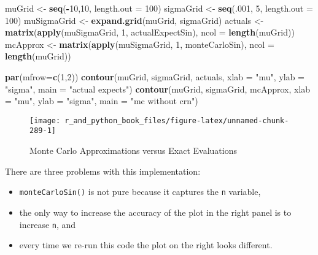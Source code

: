 \documentclass[12pt,krantz2]{krantz}
\makeatletter
\newenvironment{Shaded}{\begin{snugshade}}{\end{snugshade}}
\newcommand{\DataTypeTok}[1]{\textcolor[rgb]{0.27,0.27,0.27}{#1}}
\newcommand{\DecValTok}[1]{\textcolor[rgb]{0.06,0.06,0.06}{#1}}
\newcommand{\KeywordTok}[1]{\textcolor[rgb]{0.27,0.27,0.27}{\textbf{#1}}}
\newcommand{\NormalTok}[1]{#1}
\newcommand{\OperatorTok}[1]{\textcolor[rgb]{0.43,0.43,0.43}{\textbf{#1}}}
\newcommand{\StringTok}[1]{\textcolor[rgb]{0.5,0.5,0.5}{#1}}
\providecommand{\tightlist}{%
  \setlength{\itemsep}{0pt}\setlength{\parskip}{0pt}}
\newenvironment{kframe}{%
\medskip{}
\setlength{\fboxsep}{.8em}
 \def\at@end@of@kframe{}%
 \ifinner\ifhmode%
  \def\at@end@of@kframe{\end{minipage}}%
  \begin{minipage}{\columnwidth}%
 \fi\fi%
 \def\FrameCommand##1{\hskip\@totalleftmargin \hskip-\fboxsep
 \colorbox{shadecolor}{##1}\hskip-\fboxsep
     \hskip-\linewidth \hskip-\@totalleftmargin \hskip\columnwidth}%
 \MakeFramed {\advance\hsize-\width
   \@totalleftmargin\z@ \linewidth\hsize
   \@setminipage}}%
 {\par\unskip\endMakeFramed%
 \at@end@of@kframe}
\renewenvironment{Shaded}{\begin{kframe}}{\end{kframe}}
\makeatother
\begin{document}
\begin{Shaded}
\begin{Highlighting}[]
\NormalTok{muGrid <-}\StringTok{ }\KeywordTok{seq}\NormalTok{(}\OperatorTok{-}\DecValTok{10}\NormalTok{,}\DecValTok{10}\NormalTok{, }\DataTypeTok{length.out =} \DecValTok{100}\NormalTok{)}
\NormalTok{sigmaGrid <-}\StringTok{ }\KeywordTok{seq}\NormalTok{(.}\DecValTok{001}\NormalTok{, }\DecValTok{5}\NormalTok{, }\DataTypeTok{length.out =} \DecValTok{100}\NormalTok{)}
\NormalTok{muSigmaGrid <-}\StringTok{ }\KeywordTok{expand.grid}\NormalTok{(muGrid, sigmaGrid)}
\NormalTok{actuals <-}\StringTok{  }\KeywordTok{matrix}\NormalTok{(}\KeywordTok{apply}\NormalTok{(muSigmaGrid, }\DecValTok{1}\NormalTok{, actualExpectSin), }
                   \DataTypeTok{ncol =} \KeywordTok{length}\NormalTok{(muGrid))}
\NormalTok{mcApprox <-}\StringTok{ }\KeywordTok{matrix}\NormalTok{(}\KeywordTok{apply}\NormalTok{(muSigmaGrid, }\DecValTok{1}\NormalTok{, monteCarloSin), }
                   \DataTypeTok{ncol =} \KeywordTok{length}\NormalTok{(muGrid))}

\KeywordTok{par}\NormalTok{(}\DataTypeTok{mfrow=}\KeywordTok{c}\NormalTok{(}\DecValTok{1}\NormalTok{,}\DecValTok{2}\NormalTok{))}
\KeywordTok{contour}\NormalTok{(muGrid, sigmaGrid, actuals, }
        \DataTypeTok{xlab =} \StringTok{"mu"}\NormalTok{, }\DataTypeTok{ylab =} \StringTok{"sigma"}\NormalTok{, }\DataTypeTok{main =} \StringTok{"actual expects"}\NormalTok{)}
\KeywordTok{contour}\NormalTok{(muGrid, sigmaGrid, mcApprox, }
        \DataTypeTok{xlab =} \StringTok{"mu"}\NormalTok{, }\DataTypeTok{ylab =} \StringTok{"sigma"}\NormalTok{, }\DataTypeTok{main =} \StringTok{"mc without crn"}\NormalTok{)}
\end{Highlighting}
\end{Shaded}

\begin{figure}

{\centering \texttt{[image: r\_and\_python\_book\_files/figure-latex/unnamed-chunk-289-1]} 

}

\caption{Monte Carlo Approximations versus Exact Evaluations}\label{fig:unnamed-chunk-289}
\end{figure}

There are three problems with this implementation:

\begin{itemize}
\tightlist
\item
  \texttt{monteCarloSin()} is not pure because it captures the \texttt{n} variable,
\item
  the only way to increase the accuracy of the plot in the right panel is to increase \texttt{n}, and
\item
  every time we re-run this code the plot on the right looks different.
\end{itemize}
\end{document}
